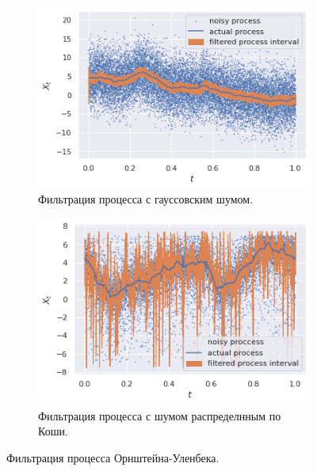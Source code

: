 \begin{figure}[ht]
    \centering
    \begin{subfigure}[b]{0.49\textwidth}
        \centering
        \includegraphics[width=\textwidth]{./resources/Gauss_filter.png}
        \caption{Фильтрация процесса с гауссовским шумом.}
        \label{subfig:Gauss_filter}
    \end{subfigure}
    \hfill
    \begin{subfigure}[b]{0.49\textwidth}
        \centering
        \includegraphics[width=\textwidth]{./resources/Cauchy_filter.png}
        \caption{Фильтрация процесса с шумом распределнным по Коши.}
        \label{subfig:Cauchy_filter}
    \end{subfigure}
    \caption{Фильтрация процесса Орнштейна-Уленбека.}
    \label{fig:filter}
\end{figure}